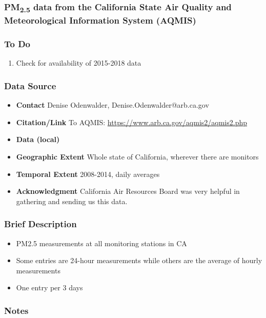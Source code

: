 \subsubsection{\texorpdfstring{PM\textsubscript{2.5}}{} data from the California State Air Quality and Meteorological Information System (AQMIS)}

\subsubsection*{To Do}
\begin{enumerate}
\item Check for availability of 2015-2018 data
\end{enumerate}

\subsubsection*{Data Source}

\begin{itemize}[nolistsep]
\item \textbf{Contact} Denise Odenwalder, Denise.Odenwalder@arb.ca.gov
\item \textbf{Citation/Link} To AQMIS: \url{https://www.arb.ca.gov/aqmis2/aqmis2.php}
\item \textbf{Data (local)} 
\item \textbf{Geographic Extent} Whole state of California, wherever there are monitors
\item \textbf{Temporal Extent} 2008-2014, daily averages
\item \textbf{Acknowledgment} California Air Resources Board was very helpful in gathering and sending us this data.
\end{itemize}

\subsubsection*{Brief Description}

\begin{itemize}
\item PM2.5 measurements at all monitoring stations in CA
\item Some entries are 24-hour measurements while others are the average of hourly measurements
\item One entry per 3 days
\end{itemize}

\subsubsection*{Notes}

